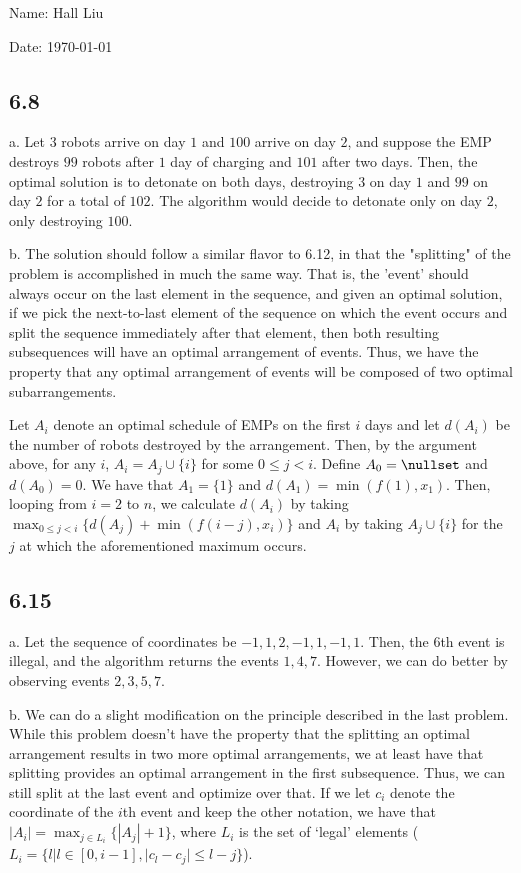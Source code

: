 \documentclass{article}
\begin{document}
Name: Hall Liu

Date: \today 

\subsection*{6.8}
a. Let $3$ robots arrive on day $1$ and $100$ arrive on day $2$, and suppose the EMP destroys $99$ robots after $1$ day of charging and $101$ after two days. Then, the optimal solution is to detonate on both days, destroying $3$ on day $1$ and $99$ on day $2$ for a total of $102$. The algorithm would decide to detonate only on day $2$, only destroying $100$.

\noindent b. The solution should follow a similar flavor to 6.12, in that the "splitting" of the problem is accomplished in much the same way. That is, the 'event' should always occur on the last element in the sequence, and given an optimal solution, if we pick the next-to-last element of the sequence on which the event occurs and split the sequence immediately after that element, then both resulting subsequences will have an optimal arrangement of events. Thus, we have the property that any optimal arrangement of events will be composed of two optimal subarrangements.

Let $A_i$ denote an optimal schedule of EMPs on the first $i$ days and let $d(A_i)$ be the number of robots destroyed by the arrangement. Then, by the argument above, for any $i$, $A_i=A_j\cup\{i\}$ for some $0\leq j<i$. Define $A_0=\nullset$ and $d(A_0)=0$. We have that $A_1=\{1\}$ and $d(A_1)=\min(f(1),x_1)$. Then, looping from $i=2$ to $n$, we calculate $d(A_i)$ by taking $\displaystyle\max_{0\leq j<i}\{d(A_j)+\min(f(i-j),x_i)\}$ and $A_i$ by taking $A_j\cup\{i\}$ for the $j$ at which the aforementioned maximum occurs.
\subsection*{6.15}
a. Let the sequence of coordinates be $-1,1,2,-1,1,-1,1$. Then, the $6$th event is illegal, and the algorithm returns the events $1,4,7$. However, we can do better by observing events $2,3,5,7$. 

b. We can do a slight modification on the principle described in the last problem. While this problem doesn't have the property that the splitting an optimal arrangement results in two more optimal arrangements, we at least have that splitting provides an optimal arrangement in the first subsequence. Thus, we can still split at the last event and optimize over that. If we let $c_i$ denote the coordinate of the $i$th event and keep the other notation, we have that $\displaystyle|A_i|=\max_{j\in L_i}\{|A_j|+1\}$, where $L_i$ is the set of `legal' elements ($L_i=\{l|l\in[0,i-1],|c_l-c_j|\leq l-j\}$). 
\end{document}
